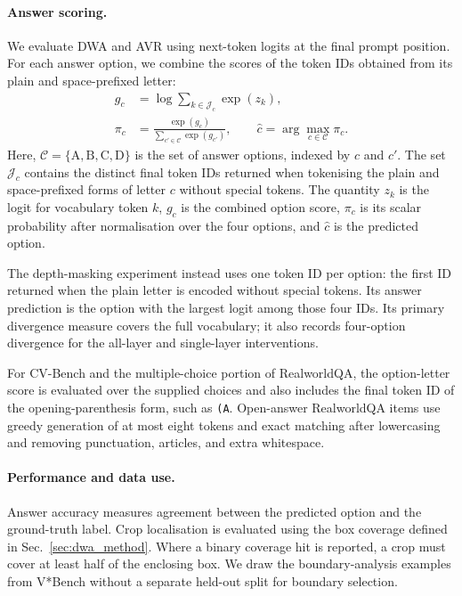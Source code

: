 \documentclass{article} %
\begin{document}
\paragraph{Answer scoring.}
We evaluate DWA and AVR using next-token logits at the final prompt
position. For each answer option, we combine the scores of the token IDs
obtained from its plain and space-prefixed letter:
\begin{align}
    g_c &= \log\sum_{k\in\mathcal{J}_c}\exp(z_k), \\
    \pi_c &= \frac{\exp(g_c)}
    {\sum_{c'\in\mathcal{C}}\exp(g_{c'})}, \qquad
    \hat{c}=\arg\max_{c\in\mathcal{C}}\pi_c.
\end{align}
Here, \(\mathcal{C}=\{\mathrm{A},\mathrm{B},\mathrm{C},\mathrm{D}\}\)
is the set of answer options, indexed by \(c\) and \(c'\).
The set \(\mathcal{J}_c\) contains the distinct final token IDs
returned when tokenising the plain and space-prefixed forms of letter
\(c\) without special tokens. The quantity \(z_k\) is the logit for
vocabulary token \(k\), \(g_c\) is the combined option score,
\(\pi_c\) is its scalar probability after normalisation over the four
options, and \(\hat{c}\) is the predicted option.

The depth-masking experiment instead uses one token ID per option:
the first ID returned when the plain letter is encoded without special
tokens. Its answer prediction is the option with the largest logit
among those four IDs. Its primary divergence measure covers the full
vocabulary; it also records four-option divergence for the all-layer
and single-layer interventions.

For CV-Bench and the multiple-choice portion of RealworldQA, the
option-letter score is evaluated over the supplied choices and also
includes the final token ID of the opening-parenthesis form, such as
\texttt{(A}. Open-answer RealworldQA items use greedy generation of at most
eight tokens and exact matching after lowercasing and removing
punctuation, articles, and extra whitespace.

\paragraph{Performance and data use.}
Answer accuracy measures agreement between the predicted option and
the ground-truth label. Crop localisation is evaluated using the box
coverage defined in Sec.~\ref{sec:dwa_method}. Where a binary coverage
hit is reported, a crop must cover at least half of the enclosing box.
We draw the boundary-analysis examples from V*Bench without a separate
held-out split for boundary selection.
\end{document}
